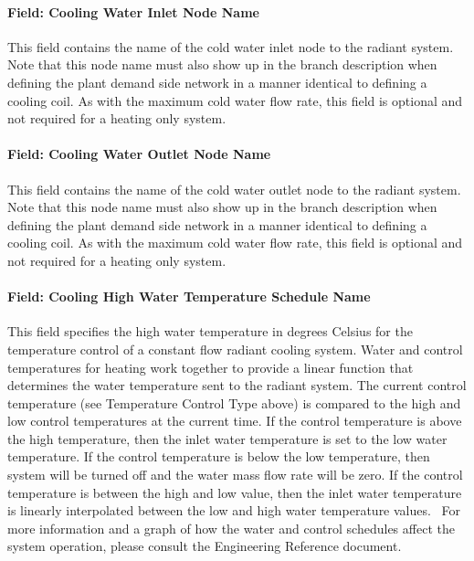 \paragraph{Field: Cooling Water Inlet Node Name}\label{field-cooling-water-inlet-node-name-1}

This field contains the name of the cold water inlet node to the radiant system. Note that this node name must also show up in the branch description when defining the plant demand side network in a manner identical to defining a cooling coil. As with the maximum cold water flow rate, this field is optional and not required for a heating only system.

\paragraph{Field: Cooling Water Outlet Node Name}\label{field-cooling-water-outlet-node-name-1}

This field contains the name of the cold water outlet node to the radiant system. Note that this node name must also show up in the branch description when defining the plant demand side network in a manner identical to defining a cooling coil. As with the maximum cold water flow rate, this field is optional and not required for a heating only system.

\paragraph{Field: Cooling High Water Temperature Schedule Name}\label{field-cooling-high-water-temperature-schedule-name}

This field specifies the high water temperature in degrees Celsius for the temperature control of a constant flow radiant cooling system. Water and control temperatures for heating work together to provide a linear function that determines the water temperature sent to the radiant system. The current control temperature (see Temperature Control Type above) is compared to the high and low control temperatures at the current time. If the control temperature is above the high temperature, then the inlet water temperature is set to the low water temperature. If the control temperature is below the low temperature, then system will be turned off and the water mass flow rate will be zero. If the control temperature is between the high and low value, then the inlet water temperature is linearly interpolated between the low and high water temperature values.~ For more information and a graph of how the water and control schedules affect the system operation, please consult the Engineering Reference document.

